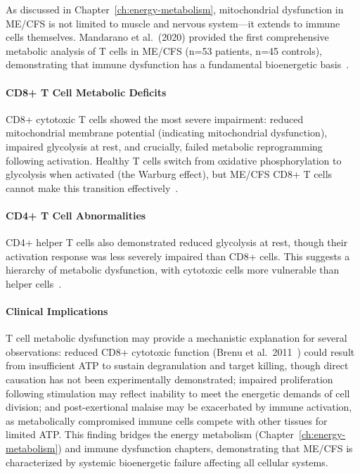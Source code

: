 As discussed in Chapter~\ref{ch:energy-metabolism}, mitochondrial dysfunction in ME/CFS is not limited to muscle and nervous system—it extends to immune cells themselves. Mandarano et al.\ (2020) provided the first comprehensive metabolic analysis of T cells in ME/CFS (n=53 patients, n=45 controls), demonstrating that immune dysfunction has a fundamental bioenergetic basis~\cite{Mandarano2020}.

\paragraph{CD8+ T Cell Metabolic Deficits}
CD8+ cytotoxic T cells showed the most severe impairment: reduced mitochondrial membrane potential (indicating mitochondrial dysfunction), impaired glycolysis at rest, and crucially, failed metabolic reprogramming following activation. Healthy T cells switch from oxidative phosphorylation to glycolysis when activated (the Warburg effect), but ME/CFS CD8+ T cells cannot make this transition effectively~\cite{Mandarano2020}.

\paragraph{CD4+ T Cell Abnormalities}
CD4+ helper T cells also demonstrated reduced glycolysis at rest, though their activation response was less severely impaired than CD8+ cells. This suggests a hierarchy of metabolic dysfunction, with cytotoxic cells more vulnerable than helper cells~\cite{Mandarano2020}.

\paragraph{Clinical Implications}
T cell metabolic dysfunction may provide a mechanistic explanation for several observations: reduced CD8+ cytotoxic function (Brenu et al.\ 2011~\cite{Brenu2011}) could result from insufficient ATP to sustain degranulation and target killing, though direct causation has not been experimentally demonstrated; impaired proliferation following stimulation may reflect inability to meet the energetic demands of cell division; and post-exertional malaise may be exacerbated by immune activation, as metabolically compromised immune cells compete with other tissues for limited ATP. This finding bridges the energy metabolism (Chapter~\ref{ch:energy-metabolism}) and immune dysfunction chapters, demonstrating that ME/CFS is characterized by systemic bioenergetic failure affecting all cellular systems.

